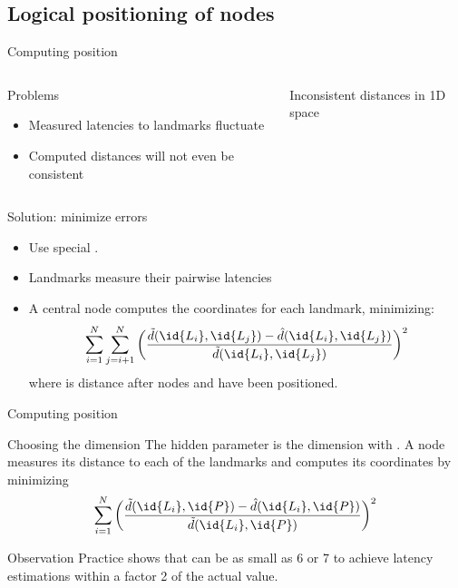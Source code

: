 \subsection{Logical positioning of nodes}
\begin{slide}{Computing position}
  \begin{columns}[T]
    \begin{column}{0.45\textwidth}
      \begin{block}{Problems}
        \begin{itemize}
        \item Measured latencies to landmarks fluctuate
        \item Computed distances will not even be consistent
        \end{itemize}
      \end{block}
    \end{column}
    \begin{column}{0.5\textwidth}
      \begin{block}{Inconsistent distances in 1D space}
        \begin{centerfig}
        \end{centerfig}
      \end{block}
    \end{column}
  \end{columns}
  \begin{block}{Solution: minimize errors}
    \begin{itemize}\tightlist
    \item Use  special  . 
    \item Landmarks measure their pairwise latencies 
    \item A central node computes the coordinates for each landmark, minimizing:
      \[
      \sum_{i=1}^N \sum_{j=i+1}^N \bigg(\frac{\tilde{d}(\id{L_i}, \id{L_j})
        - \hat{d}(\id{L_i},\id{L_j})}{\tilde{d}(\id{L_i},\id{L_j})}\bigg)^{2}
      \]
      where  is distance after nodes  and  have been
      positioned.
    \end{itemize}
  \end{block}
\end{slide}
\begin{slide}{Computing position}
  \begin{block}{Choosing the dimension }
    The hidden parameter is the dimension  with . A node  measures its
    distance to each of the  landmarks and computes its coordinates by minimizing
    \[
    \sum_{i=1}^N \bigg(\frac{\tilde{d}(\id{L_i}, \id{P})
      - \hat{d}(\id{L_i},\id{P})}{\tilde{d}(\id{L_i},\id{P})}\bigg)^{2}
    \]
  \end{block}
  \begin{block}{Observation}
    Practice shows that  can be as small as 6 or 7 to achieve latency estimations within a factor
    2 of the actual value.
  \end{block}
\end{slide}
